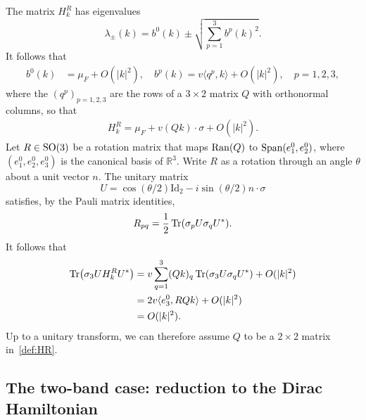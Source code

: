 \documentclass[a4paper,11pt]{article}
\theoremstyle{plain}
\theoremstyle{remark}
\def\R{{\mathbb R}}
\begin{document}
The matrix $H_k^{R}$ has eigenvalues
$$  \lambda_{\pm}(k) = b^{0}(k) \pm \sqrt{\sum_{p=1}^{3}b^{p}(k)^{2}}.
$$
It follows that
\begin{align*}
  b^{0}(k) &= \mu_{F} + O(|k|^{2}), \quad
  b^{p}(k) = v\langle q^{p}, k\rangle + O(|k|^{2}), \quad p=1,2,3,
\end{align*}
where the $(q^{p})_{p=1,2,3}$ are the rows of a $3 \times 2$
matrix $Q$ with orthonormal columns, so that
\begin{align}\label{def:HR}
  H_k^{R} = \mu_{F} + v (Q k) \cdot \sigma + O(|k|^{2}).
\end{align}
Let $R \in {\rm SO}(3)$ be a rotation matrix that maps
${\rm Ran}(Q)$ to ${\rm Span}(e^0_{1},e^0_{2})$, where $(e^0_{1},e^0_{2},e^0_{3})$ is the canonical basis of $\R^3$. Write $R$ as a rotation through an angle $\theta$ about a unit vector $n$.
The unitary matrix
\[
U=\cos(\theta/2)\mathrm{Id}_2-i\sin(\theta/2)n\cdot\sigma
\]
satisfies, by the Pauli matrix identities,
\begin{align*}
  R_{pq} = \frac 1 2 \Tr(\sigma_{p} U \sigma_{q} U^{*}).
\end{align*}
It follows that
\begin{align*}
  \Tr(\sigma_{3} U H_k^{R} U^{*}) &= v\sum_{q=1}^{3} (Q k)_{q} \Tr(\sigma_{3} U \sigma_{q} U^{*}) + O(|k|^{2})\\
  &= 2 v\langle e^0_3,RQk\rangle+O(|k|^2)\\
  &= O(|k|^{2}).
\end{align*}
Up to a unitary transform, we can therefore assume $Q$ to be
a $2\times 2$ matrix in~\eqref{def:HR}.

\subsection{The two-band case: reduction to the Dirac Hamiltonian}
\end{document}
